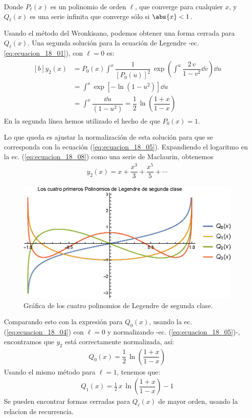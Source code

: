 Donde $P_{\ell}(x)$ es un polinomio de orden $\ell$, que converge para cualquier $x$, y $Q_{\ell}(x)$ es una serie infinita que converge sólo si $\abs{x} < 1$.
\par
Usando el método del Wronkisano, podemos obtener una forma cerrada para $Q_{\ell}(x)$. Una segunda solución para la ecuación de Legendre -ec. \ref{eq:ecuacion_18_01}), con $\ell = 0$ es:
\begin{align}
\begin{aligned}[b]
y_{2}(x) &= P_{0}(x) \int^{x} \dfrac{1}{[P_{0}(u)]^{2}} \, \exp \left( \int^{u} \dfrac{2 \, v}{1 - v^{2}} \dd{v} \right) \dd{u} \\[0.5em]
&= \int^{x} \exp [ - \ln (1 - u^{2}) ] \dd{u} \\[0.5em]
&= \int^{x} \dfrac{\dd{u}}{(1 - u^{2})} = \dfrac{1}{2} \, \ln \left( \dfrac{1 + x}{1 - x} \right)
\end{aligned}
\label{eq:ecuacion_18_08}
\end{align}
En la segunda línea hemos utilizado el hecho de que $P_{0}(x)=1$.
\par
Lo que queda es ajustar la normalización de esta solución para que se corresponda con la ecuación (\ref{eq:ecuacion_18_05}). Expandiendo el logaritmo en la ec. (\ref{eq:ecuacion_18_08}) como una serie de Maclaurin, obtenemos
\begin{align*}
y_{2}(x) = x + \dfrac{x^{3}}{3} + \dfrac{x^{5}}{5} + \cdots \end{align*}
\begin{figure}[H]
    \centering
    \includegraphics[scale=1.2]{Imagenes/Plot_LagrangeSC_0-4.eps}
    \caption{Gráfica de los cuatro polinomios de Legendre de segunda clase.}
    \label{fig:polinomios_Lagrange_02}
\end{figure}
Comparando esto con la expresión para $Q_{0}(x)$, usando la ec. (\ref{eq:ecuacion_18_04}) con $\ell = 0$ y normalizando -ec. (\ref{eq:ecuacion_18_05})-, encontramos que $y_{2}$ está correctamente normalizada, así:
\begin{align*}
Q_{0} (x) = \dfrac{1}{2} \, \ln \left( \dfrac{1 + x}{1 - x} \right)
\end{align*}
Usando el mismo método para $\ell = 1$, tenemos que:
\begin{align*}
Q_{1} (x) =  \frac{1}{2} \, x \,  \ln \left( \dfrac{1 + x}{1 - x} \right) - 1
\end{align*}
Se pueden encontrar formas cerradas para $Q_{\ell}(x)$ de mayor orden, usando la relacion de recurrencia.

